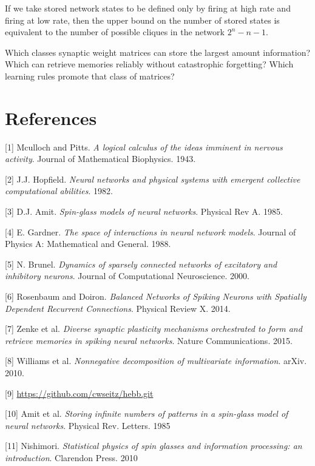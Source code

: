 \documentclass{article} %
\begin{document}
If we take stored network states to be defined only by firing at high rate and firing at low rate, then the upper bound on the number of stored states is equivalent to the number of possible cliques in the network $2^{n} - n - 1$. 

Which classes synaptic weight matrices can store the largest amount information?
Which can retrieve memories reliably without catastrophic forgetting?
Which learning rules promote that class of matrices? 


\section*{References}

[1] Mculloch and Pitts. \textit{A logical calculus of the ideas imminent in nervous activity}. Journal of Mathematical Biophysics. 1943.

[2] J.J. Hopfield. \textit{Neural networks and physical systems with emergent collective computational abilities}. 1982.

[3] D.J. Amit. \textit{Spin-glass models of neural networks}. Physical Rev A. 1985.

[4] E. Gardner. \textit{The space of interactions in neural network models}. Journal of Physics A: Mathematical and General. 1988.

[5] N. Brunel. \textit{Dynamics of sparsely connected networks of excitatory and inhibitory neurons}. Journal of Computational Neuroscience. 2000. 

[6] Rosenbaum and Doiron. \textit{Balanced Networks of Spiking Neurons with Spatially Dependent Recurrent Connections}. Physical Review X. 2014.

[7] Zenke et al. \textit{Diverse synaptic plasticity mechanisms
orchestrated to form and retrieve memories
in spiking neural networks}. Nature Communications. 2015.

[8] Williams et al. \textit{Nonnegative decomposition of multivariate information}. arXiv. 2010.

[9] \url{https://github.com/cwseitz/hebb.git}

[10] Amit et al. \textit{Storing infinite numbers of patterns in a spin-glass model of neural networks}. Physical Rev. Letters. 1985

[11] Nishimori. \textit{Statistical physics of spin glasses and information processing: an introduction}. Clarendon Press. 2010
\end{document}
